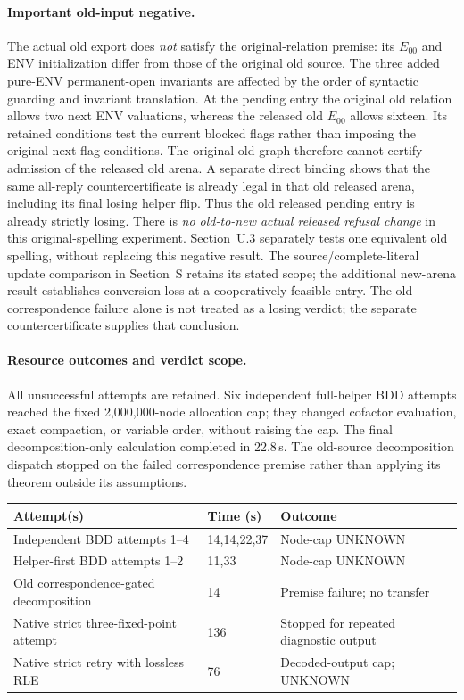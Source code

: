 \paragraph{Important old-input negative.}
The actual old export does \emph{not} satisfy the original-relation
premise: its $E_{00}$ and ENV initialization differ from those of the
original old source. The three added pure-ENV permanent-open invariants
are affected by the order of syntactic guarding and invariant translation.
At the pending entry the original old relation allows two next ENV
valuations, whereas the released old $E_{00}$ allows sixteen. Its
retained conditions test the current blocked flags rather than imposing
the original next-flag conditions. The original-old graph therefore
cannot certify admission of the released old arena.
A separate direct binding shows that the same all-reply countercertificate
is already legal in that old released arena, including its final losing
helper flip. Thus the old released pending entry is already strictly
losing. There is \emph{no old-to-new actual released refusal change} in
this original-spelling experiment. Section~U.3 separately tests one
equivalent old spelling, without replacing this negative result. The source/complete-literal update comparison in
Section~S retains its stated scope; the additional new-arena result
establishes conversion loss at a cooperatively feasible entry.
The old correspondence failure alone is not treated as a losing verdict;
the separate countercertificate supplies that conclusion.

\paragraph{Resource outcomes and verdict scope.}
All unsuccessful attempts are retained. Six independent full-helper BDD
attempts reached the fixed 2,000,000-node allocation cap; they changed
cofactor evaluation, exact compaction, or variable order, without raising
the cap. The final decomposition-only calculation completed in 22.8\,s.
The old-source decomposition dispatch stopped on the failed correspondence
premise rather than applying its theorem outside its assumptions.

\begin{center}
\begin{tabular}{p{.43\linewidth}p{.12\linewidth}p{.36\linewidth}}\toprule
Attempt(s) & Time (s) & Outcome\\\midrule
Independent BDD attempts 1--4 &14,14,22,37& Node-cap UNKNOWN\\
Helper-first BDD attempts 1--2 &11,33& Node-cap UNKNOWN\\
Old correspondence-gated decomposition &14& Premise failure; no transfer\\
Native strict three-fixed-point attempt &136& Stopped for repeated diagnostic output\\
Native strict retry with lossless RLE &76& Decoded-output cap; UNKNOWN\\\bottomrule
\end{tabular}
\end{center}

